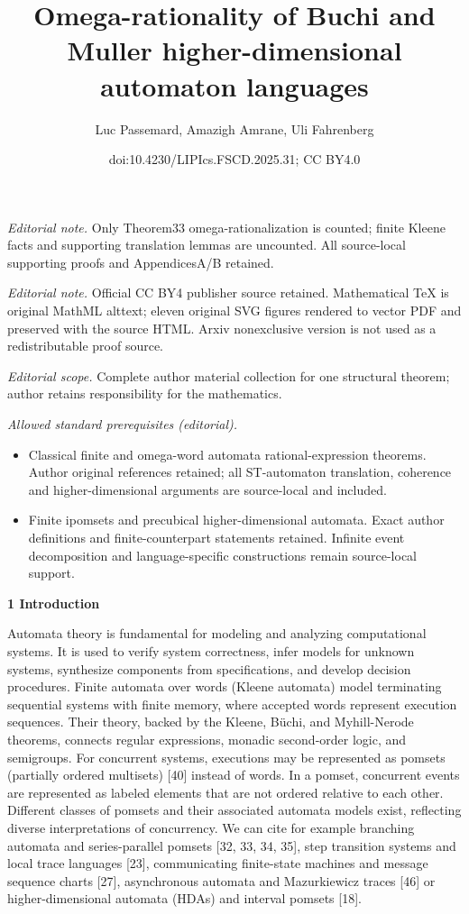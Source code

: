 \documentclass[10pt,a4paper]{article}
\title{Omega-rationality of Buchi and Muller higher-dimensional automaton languages}
\author{Luc Passemard, Amazigh Amrane, Uli Fahrenberg}
\date{doi:10.4230/LIPIcs.FSCD.2025.31; CC BY4.0}
\begin{document}
\maketitle
\noindent\textit{Editorial note.} Only Theorem33 omega-rationalization is counted; finite Kleene facts and supporting translation lemmas are uncounted. All source-local supporting proofs and AppendicesA/B retained.\par\medskip
\noindent\textit{Editorial note.} Official CC BY4 publisher source retained. Mathematical TeX is original MathML alttext; eleven original SVG figures rendered to vector PDF and preserved with the source HTML. Arxiv nonexclusive version is not used as a redistributable proof source.\par\medskip
\noindent\textit{Editorial scope.} Complete author material collection for one structural theorem; author retains responsibility for the mathematics.\par\medskip
\noindent\textit{Allowed standard prerequisites (editorial).}\begin{itemize}
\item Classical finite and omega-word automata rational-expression theorems. Author original references retained; all ST-automaton translation, coherence and higher-dimensional arguments are source-local and included.
\item Finite ipomsets and precubical higher-dimensional automata. Exact author definitions and finite-counterpart statements retained. Infinite event decomposition and language-specific constructions remain source-local support.
\end{itemize}\medskip

 
\par\medskip\noindent\textbf{1 Introduction}\par
 
 
Automata theory is fundamental for modeling and analyzing computational systems. It is used to verify system correctness, infer models for unknown systems, synthesize components from specifications, and develop decision procedures. Finite automata over words (Kleene automata) model terminating sequential systems with finite memory, where accepted words represent execution sequences. Their theory, backed by the Kleene, Büchi, and Myhill-Nerode theorems, connects regular expressions, monadic second-order logic, and semigroups. For concurrent systems, executions may be represented as pomsets (partially ordered multisets) [40] instead of words. In a pomset, concurrent events are represented as labeled elements that are not ordered relative to each other. Different classes of pomsets and their associated automata models exist, reflecting diverse interpretations of concurrency. We can cite for example branching automata and series-parallel pomsets [32, 33, 34, 35], step transition systems and local trace languages [23], communicating finite-state machines and message sequence charts [27], asynchronous automata and Mazurkiewicz traces [46] or higher-dimensional automata (HDAs) and interval pomsets [18].\par
 
\end{document}
